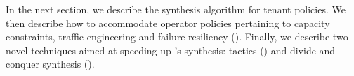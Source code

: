 In the next section, we describe the \Name synthesis
algorithm for tenant policies. 
We then describe how to accommodate operator policies pertaining to
capacity constraints, traffic engineering and failure resiliency
().  Finally, we describe two novel techniques aimed at
speeding up \Name's synthesis: tactics () and
divide-and-conquer synthesis ().



